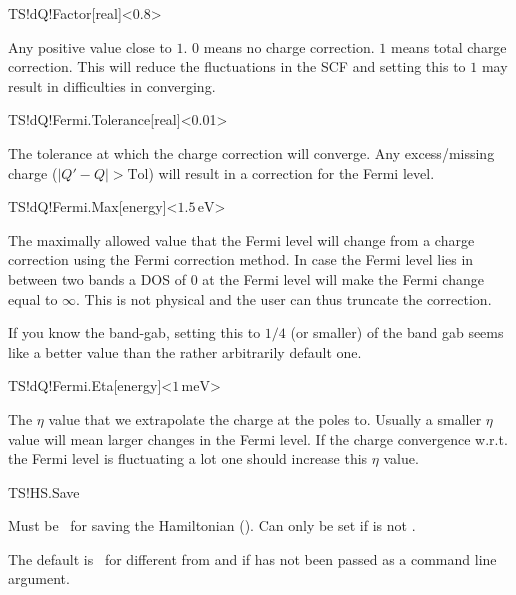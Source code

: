 \begin{fdfentry}{TS!dQ!Factor}[real]<0.8>

  Any positive value close to $1$. $0$ means no charge correction. $1$
  means total charge correction. This will reduce the fluctuations in
  the SCF and setting this to $1$ may result in difficulties in
  converging.
  
\end{fdfentry}

\begin{fdfentry}{TS!dQ!Fermi.Tolerance}[real]<0.01>

  The tolerance at which the charge correction will converge. Any
  excess/missing charge ($|Q'-Q|>\mathrm{Tol}$) will result in a
  correction for the Fermi level.
  
\end{fdfentry}

\begin{fdfentry}{TS!dQ!Fermi.Max}[energy]<$1.5\,\mathrm{eV}$>%

  The maximally allowed value that the Fermi level will change from a
  charge correction using the Fermi correction method. In case the
  Fermi level lies in between two bands a DOS of $0$ at the Fermi
  level will make the Fermi change equal to $\infty$. This is not
  physical and the user can thus truncate the correction.

  \note If you know the band-gab, setting this to $1/4$ (or smaller)
  of the band gab seems like a better value than the rather
  arbitrarily default one.

\end{fdfentry}

\begin{fdfentry}{TS!dQ!Fermi.Eta}[energy]<$1\,\mathrm{meV}$>%

  The $\eta$ value that we extrapolate the charge at the poles to.
  Usually a smaller $\eta$ value will mean larger changes in the
  Fermi level. If the charge convergence w.r.t. the Fermi level is
  fluctuating a lot one should increase this $\eta$ value.

\end{fdfentry}

\begin{fdflogicalT}{TS!HS.Save}

  Must be \fdftrue\ for saving the Hamiltonian (). Can only be set if
   is not .

  The default is \fdffalse\ for  different from
   and if  has not been passed as a
  command line argument.

\end{fdflogicalT}  

